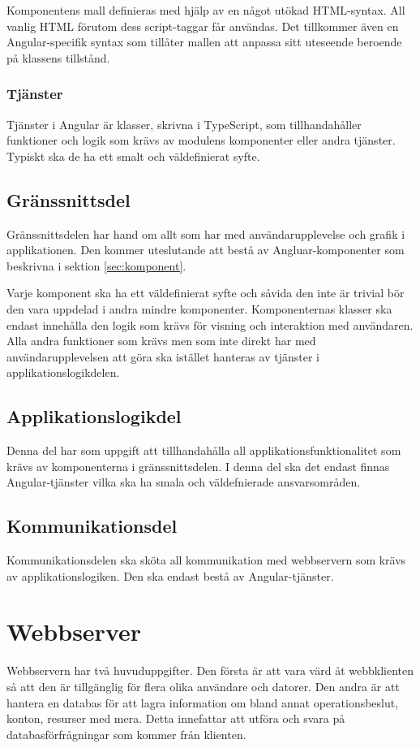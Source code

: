 \documentclass[a4paper,10pt]{article}
\begin{document}
Komponentens mall definieras med hjälp av en något utökad HTML-syntax. All vanlig HTML förutom dess script-taggar får användas. Det tillkommer även en Angular-specifik syntax som tillåter mallen att anpassa sitt uteseende beroende på klassens tillstånd.
\subsubsection{Tjänster}
Tjänster i Angular är klasser, skrivna i TypeScript, som tillhandahåller funktioner och logik som krävs av modulens komponenter eller andra tjänster. Typiskt ska de ha ett smalt och väldefinierat syfte.

\subsection{Gränssnittsdel}
Gränssnittsdelen har hand om allt som har med användarupplevelse och grafik i applikationen. Den kommer uteslutande att bestå av Angluar-komponenter som beskrivna i sektion \ref{sec:komponent}.

Varje komponent ska ha ett väldefinierat syfte och såvida den inte är trivial bör den vara uppdelad i andra mindre komponenter. Komponenternas klasser ska endast innehålla den logik som krävs för visning och interaktion med användaren. Alla andra funktioner som krävs men som inte direkt har med användarupplevelsen att göra ska istället hanteras av tjänster i applikationslogikdelen.

\subsection{Applikationslogikdel}
Denna del har som uppgift att tillhandahålla all applikationsfunktionalitet som krävs av komponenterna i gränssnittsdelen. I denna del ska det endast finnas Angular-tjänster vilka ska ha smala och väldefnierade ansvarsområden.

\subsection{Kommunikationsdel}
Kommunikationsdelen ska sköta all kommunikation med webbservern som krävs av applikationslogiken. Den ska endast bestå av Angular-tjänster.

\section{Webbserver}
\label{sec:webbserver}
Webbservern har två huvuduppgifter. Den första är att vara värd åt webbklienten så att den är tillgänglig för flera olika användare och datorer. Den andra är att hantera en databas för att lagra information om bland annat operationsbeslut, konton, resurser med mera. Detta innefattar att utföra och svara på databasförfrågningar som kommer från klienten.
\end{document}
